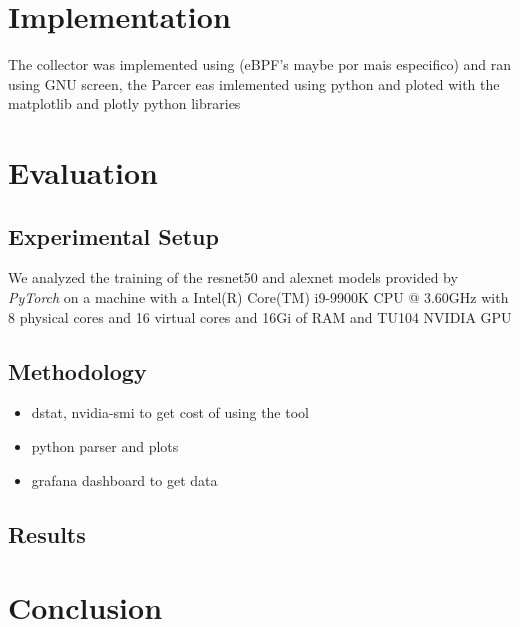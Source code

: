 \documentclass[conference]{IEEEtran}
\begin{document}
\section{Implementation}
    The collector was implemented using (eBPF's maybe por mais especifico) and ran using GNU screen, the Parcer eas imlemented using python and ploted with the matplotlib and plotly python libraries 

\section{Evaluation}
\subsection{Experimental Setup}

We analyzed the training of the resnet50 \cite{resnet50} and alexnet \cite{alexnet} models
provided by \textit{PyTorch} on a machine with a Intel(R) Core(TM) i9-9900K CPU @ 3.60GHz with
8 physical cores and 16 virtual cores and 16Gi of RAM and TU104 NVIDIA GPU


\subsection{Methodology}

\begin{itemize}
    \item dstat, nvidia-smi to get cost of using the tool
    \item python parser and plots
    \item grafana dashboard to get data 
\end{itemize}

\subsection{Results}

\section{Conclusion}


\end{document}
